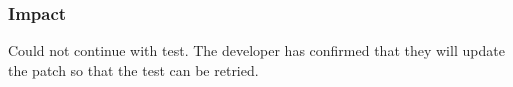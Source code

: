\subsubsection{Impact}
Could not continue with test. The developer has confirmed that they will update the patch so that the test can be retried.
